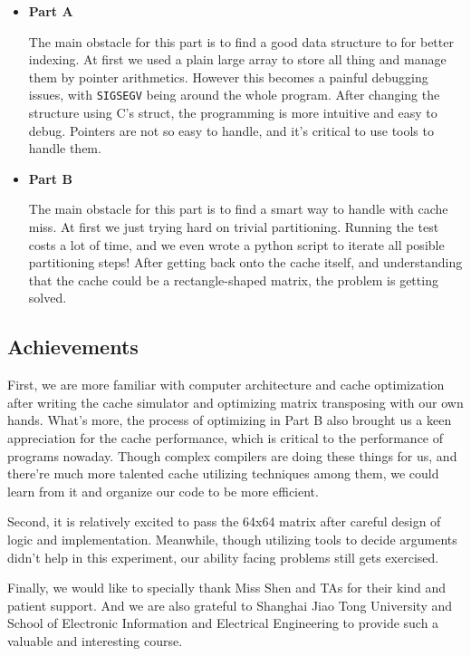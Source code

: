 \documentclass{article}
\begin{document}
\begin{itemize}
	\item \textbf{Part A}
	
    The main obstacle for this part is to find a good data structure to for better indexing. At first we used a plain large array to store all thing and manage them by pointer arithmetics. However this becomes a painful debugging issues, with \texttt{SIGSEGV} being around the whole program. After changing the structure using C's struct, the programming is more intuitive and easy to debug. Pointers are not so easy to handle, and it's critical to use tools to handle them.
		
	\item \textbf{Part B}
	
    The main obstacle for this part is to find a smart way to handle with cache miss. At first we just trying hard on trivial partitioning. Running the test costs a lot of time, and we even wrote a python script to iterate all posible partitioning steps! After getting back onto the cache itself, and understanding that the cache could be a rectangle-shaped matrix, the problem is getting solved.
\end{itemize}

\subsection{Achievements}

First, we are more familiar with computer architecture and cache optimization after writing the cache simulator and optimizing matrix transposing with our own hands. What's more, the process of optimizing in Part B also brought us a keen appreciation for the cache performance, which is critical to the performance of programs nowaday. Though complex compilers are doing these things for us, and there're much more talented cache utilizing techniques among them, we could learn from it and organize our code to be more efficient.

Second, it is relatively excited to pass the 64x64 matrix after careful design of logic and implementation. Meanwhile, though utilizing tools to decide arguments didn't help in this experiment, our ability facing problems still gets exercised.

Finally, we would like to specially thank Miss Shen and TAs for their kind and patient support. And we are also grateful to Shanghai Jiao Tong University and School of Electronic Information and Electrical Engineering to provide such a valuable and interesting course.



\end{document}
